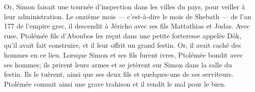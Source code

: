 Or, Simon faisait une tournée d’inspection dans les villes du pays,
	pour veiller à leur administration.
Le onzième mois --- c’est-à-dire le mois de Shebath --- de l’an 177 de l’empire grec,
	il descendit à Jéricho avec ses fils Mattathias et Judas.
Avec ruse, Ptolémée fils d’Aboubos les reçut dans une petite forteresse appelée Dôk,
	qu’il avait fait construire,
	et il leur offrit un grand festin.
Or, il avait caché des hommes en ce lieu.
Lorsque Simon et ses fils furent ivres, Ptolémée bondit avec ses hommes;
	ils prirent leurs armes et se jetèrent sur Simon dans la salle du festin.
Ils le tuèrent, ainsi que ses deux fils et quelques-uns de ses serviteurs.
	Ptolémée commit ainsi une grave trahison et il rendit le mal pour le bien.
